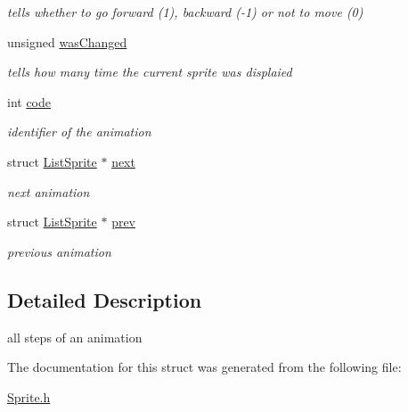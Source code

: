 \begin{DoxyCompactItemize}
\begin{DoxyCompactList}\small\item\em tells whether to go forward (1), backward (-\/1) or not to move (0) \end{DoxyCompactList}\item 
unsigned \hyperlink{structListSprite_acb741e12837c8bf6499506f30ca46477}{was\+Changed}\hypertarget{structListSprite_acb741e12837c8bf6499506f30ca46477}{}\label{structListSprite_acb741e12837c8bf6499506f30ca46477}

\begin{DoxyCompactList}\small\item\em tells how many time the current sprite was displaied \end{DoxyCompactList}\item 
int \hyperlink{structListSprite_acf824bc4a786357423b4e697ab7e3c91}{code}\hypertarget{structListSprite_acf824bc4a786357423b4e697ab7e3c91}{}\label{structListSprite_acf824bc4a786357423b4e697ab7e3c91}

\begin{DoxyCompactList}\small\item\em identifier of the animation \end{DoxyCompactList}\item 
struct \hyperlink{structListSprite}{List\+Sprite} $\ast$ \hyperlink{structListSprite_a9a866f0341b7fad117cbf1d19e1cba9c}{next}\hypertarget{structListSprite_a9a866f0341b7fad117cbf1d19e1cba9c}{}\label{structListSprite_a9a866f0341b7fad117cbf1d19e1cba9c}

\begin{DoxyCompactList}\small\item\em next animation \end{DoxyCompactList}\item 
struct \hyperlink{structListSprite}{List\+Sprite} $\ast$ \hyperlink{structListSprite_a9ea0649f66bf1b779298adc3281ce8b8}{prev}\hypertarget{structListSprite_a9ea0649f66bf1b779298adc3281ce8b8}{}\label{structListSprite_a9ea0649f66bf1b779298adc3281ce8b8}

\begin{DoxyCompactList}\small\item\em previous animation \end{DoxyCompactList}\end{DoxyCompactItemize}


\subsection{Detailed Description}
all steps of an animation 

The documentation for this struct was generated from the following file\+:\begin{DoxyCompactItemize}
\item 
\hyperlink{Sprite_8h}{Sprite.\+h}\end{DoxyCompactItemize}
